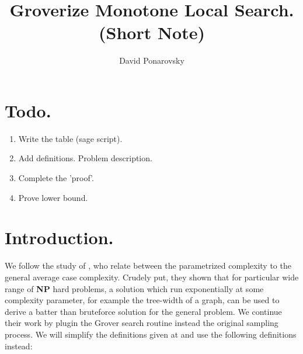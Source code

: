 \documentclass[manuscript,screen,review]{acmart}
\begin{document}


\title{Groverize Monotone Local Search. (Short Note)} 
\author{David Ponarovsky}

\ifdefined\ACM
\else
  \maketitle
\fi
%
\ifdefined\ACM
  \maketitle
\fi

% 
%


\newcommand{\Oh}{{\mathcal{O}}}
\newcommand{\bitsize}{N}
\newcommand{\longversion}[1]{#1}
\newcommand{\abpartization}{{\sc Vertex $(r,\ell)$-Partization}}


\section{Todo.}
\begin{enumerate}
  \item Write the table (sage script).
  \item Add definitions. Problem description.  
  \item Complete the 'proof'. 
  \item Prove lower bound. 
\end{enumerate}

\section{Introduction.} We follow the study of \cite{fomin2015exact}, who relate between the parametrized complexity to the general average case complexity. Crudely put, they shown that for particular wide range of \textbf{NP} hard problems, a solution which run exponentially at some complexity parameter, for example the tree-width of a graph, can be used to derive a batter than bruteforce solution for the general problem. We continue their work by plugin the Grover search   \cite{grover1996fast} routine instead the original sampling process.  We will simplify the definitions given at \cite{fomin2015exact} and use the following definitions instead:
\end{document}
